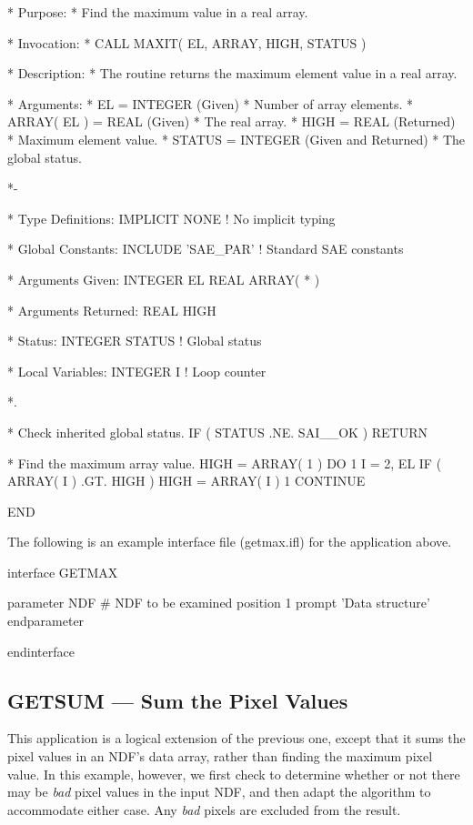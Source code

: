 \documentclass[twoside,11pt,nolof]{starlink}
\providecommand{\st}[1]{{\emph{#1}}}
\begin{document}
\begin{terminalv}
*  Purpose:
*     Find the maximum value in a real array.

*  Invocation:
*     CALL MAXIT( EL, ARRAY, HIGH, STATUS )

*  Description:
*     The routine returns the maximum element value in a real array.

*  Arguments:
*     EL = INTEGER (Given)
*        Number of array elements.
*     ARRAY( EL ) = REAL (Given)
*        The real array.
*     HIGH = REAL (Returned)
*        Maximum element value.
*     STATUS = INTEGER (Given and Returned)
*        The global status.

*-

*  Type Definitions:
      IMPLICIT NONE              ! No implicit typing

*  Global Constants:
      INCLUDE 'SAE_PAR'          ! Standard SAE constants

*  Arguments Given:
      INTEGER EL
      REAL ARRAY( * )

*  Arguments Returned:
      REAL HIGH

*  Status:
      INTEGER STATUS             ! Global status

*  Local Variables:
      INTEGER I                  ! Loop counter

*.

*  Check inherited global status.
      IF ( STATUS .NE. SAI__OK ) RETURN

*  Find the maximum array value.
      HIGH = ARRAY( 1 )
      DO 1 I = 2, EL
         IF ( ARRAY( I ) .GT. HIGH ) HIGH = ARRAY( I )
 1    CONTINUE

      END
\end{terminalv}
\normalsize

The following is an example  interface file
(getmax.ifl) for the application above.

\small
\begin{terminalv}
interface GETMAX

   parameter NDF                 # NDF to be examined
      position 1
      prompt   'Data structure'
   endparameter

endinterface
\end{terminalv}
\normalsize

\newpage
\subsection{GETSUM --- Sum the Pixel Values}

This application is a logical extension of the previous one, except that it sums
the pixel values in an NDF's data array, rather than finding the maximum pixel
value. In this example, however, we first check to determine whether or not
there may be \st{bad\/} pixel values in the input NDF, and then adapt the
algorithm to accommodate either case. Any \st{bad\/} pixels are excluded from
the result.
\end{document}
